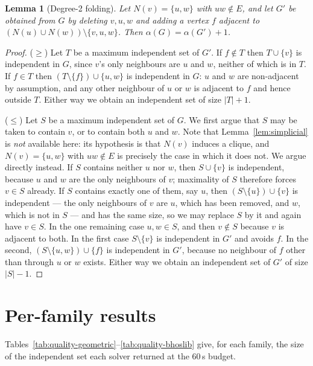 \documentclass[preprint,authoryear,11pt]{elsarticle}
\newtheorem{lemma}[theorem]{Lemma}
\theoremstyle{definition}
\begin{document}
\begin{lemma}[Degree-2 folding]
\label{lem:fold}
Let $N(v) = \{u,w\}$ with $uw \notin E$, and let $G'$ be obtained from $G$ by
deleting $v,u,w$ and adding a vertex $f$ adjacent to
$(N(u) \cup N(w)) \setminus \{v,u,w\}$. Then $\alpha(G) = \alpha(G') + 1$.
\end{lemma}

\begin{proof}
($\ge$) Let $T$ be a maximum independent set of $G'$. If $f \notin T$ then
$T \cup \{v\}$ is independent in $G$, since $v$'s only neighbours are $u$ and
$w$, neither of which is in $T$. If $f \in T$ then $(T \setminus \{f\}) \cup
\{u,w\}$ is independent in $G$: $u$ and $w$ are non-adjacent by assumption, and
any other neighbour of $u$ or $w$ is adjacent to $f$ and hence outside $T$.
Either way we obtain an independent set of size $|T| + 1$.

($\le$) Let $S$ be a maximum independent set of $G$. We first argue that $S$
may be taken to contain $v$, or to contain both $u$ and $w$. Note that
Lemma~\ref{lem:simplicial} is \emph{not} available here: its hypothesis is that
$N(v)$ induces a clique, and $N(v) = \{u,w\}$ with $uw \notin E$ is precisely the
case in which it does not. We argue directly instead. If $S$ contains neither
$u$ nor $w$, then $S \cup \{v\}$ is independent, because $u$ and $w$ are the only
neighbours of $v$; maximality of $S$ therefore forces $v \in S$ already. If $S$
contains exactly one of them, say $u$, then $(S \setminus \{u\}) \cup \{v\}$ is
independent --- the only neighbours of $v$ are $u$, which has been removed, and
$w$, which is not in $S$ --- and has the same size, so we may replace $S$ by it
and again have $v \in S$. In the one remaining case $u,w \in S$, and then
$v \notin S$ because $v$ is adjacent to both. In the first case
$S \setminus \{v\}$ is independent in $G'$ and avoids $f$. In the second,
$(S \setminus \{u,w\}) \cup \{f\}$ is independent in $G'$, because no neighbour
of $f$ other than through $u$ or $w$ exists. Either way we obtain an independent
set of $G'$ of size $|S| - 1$.
\end{proof}


\section{Per-family results}
\label{sec:s-quality}
Tables~\ref{tab:quality-geometric}--\ref{tab:quality-bhoslib} give, for each family, the size of the
independent set each solver returned at the 60\,s budget.






\end{document}
